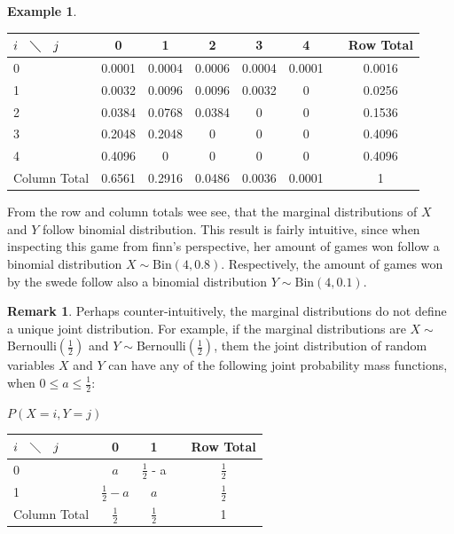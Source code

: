 \documentclass[12pt,a4paper,leqno]{report}
\theoremstyle{plain}
\theoremstyle{definition}
\newtheorem{esim}[equation]{Example}
\newtheorem{remark}[equation]{Remark}
\begin{document}
\begin{esim}
\begin{center}
\begin{tabular}{L{2cm} c c c c c L{1cm} c}
\toprule
$i \quad \diagdown \quad j$  & 0 & 1 & 2 & 3 & 4 && Row Total\\
 & 0.0001 & 0.0004 & 0.0006 & 0.0004 & 0.0001 && 0.0016\\
1 & 0.0032 & 0.0096 & 0.0096 & 0.0032 & 0 && 0.0256\\
2 & 0.0384 & 0.0768 & 0.0384 & 0 & 0 && 0.1536\\
3 & 0.2048 & 0.2048 & 0 & 0 & 0 && 0.4096\\
4 & 0.4096 & 0 & 0 & 0 & 0 && 0.4096\\
\midrule
Column Total & 0.6561 & 0.2916 & 0.0486 & 0.0036 & 0.0001 && 1\\
\bottomrule 
\end{tabular}
\end{center}
\bigskip
\bigskip

From the row and column totals wee see, that the marginal distributions of $X$ and $Y$ follow binomial distribution. This result is fairly intuitive, since when inspecting this game from finn's perspective, her amount of games won follow a binomial distribution $X\sim \text{Bin}(4,0.8)$. Respectively, the amount of games won by the swede follow also a binomial distribution $Y\sim \text{Bin}(4,0.1)$.
\end{esim}

\begin{remark}
Perhaps counter-intuitively, the marginal distributions do not define a unique joint distribution. For example, if the marginal distributions are  $X\sim$Bernoulli$(\frac{1}{2})$ and $Y\sim$Bernoulli$(\frac{1}{2})$, them the joint distribution of random variables $X$ and $Y$ can have any of the following joint probability mass functions, when $0 \leq a \leq \frac{1}{2}$:

\bigskip

\begin{center}
$P(X = i, Y = j)$

\begin{tabular}{L{2cm} c c L{1cm} c}
\toprule
$i \quad \diagdown \quad j$  & 0 & 1  && Row Total\\
 & $a$ & $\frac{1}{2}$ - a && $\frac{1}{2}$\\
1 & $\frac{1}{2} - a$ & $a$ && $\frac{1}{2}$\\
\midrule
Column Total & $\frac{1}{2}$ & $\frac{1}{2}$  && 1\\
\bottomrule 
\end{tabular}
\end{center}
\end{remark}
\end{document}
